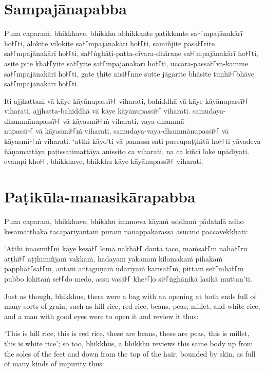\paliPage
\section*{Sampajānapabba}

Puna caparaṁ, bhikkhave, bhikkhu abhikkante paṭikkante sa꜔꜒mpajānakārī ho꜔꜒ti,
ālokite vilokite sa꜔꜒mpajānakārī ho꜔꜒ti, samiñjite pasā꜔꜒rite sa꜔꜒mpajānakārī ho꜔꜒ti,
sa꜔꜒ṅghāṭi-patta-cīvara-dhāraṇe sa꜔꜒mpajānakārī ho꜔꜒ti, asite pīte khā꜔꜒yite sā꜔꜒yite
sa꜔꜒mpajānakārī ho꜔꜒ti, uccāra-passā꜔꜒va-kamme sa꜔꜒mpajānakārī ho꜔꜒ti, gate ṭhite nisi꜔꜒nne
sutte jāgarite bhāsite tuṇhī꜔꜒bhāve sa꜔꜒mpajānakārī ho꜔꜒ti.

Iti ajjhattaṁ vā kāye kāyānupassī꜔꜒ viharati, bahiddhā vā kāye kāyānupassī꜔꜒
viharati, ajjhatta-bahiddhā vā kāye kāyānupassī꜔꜒ viharati. samudaya-dhammānupassī꜔꜒
vā kāyasmi꜔꜒ṁ viharati, vaya-dhammā-\\
nupassī꜔꜒ vā kāyasmi꜔꜒ṁ viharati, samudaya-vaya-dhammānupassī꜔꜒ vā kāyasmi꜔꜒ṁ viharati.
‘atthi kāyo’ti vā panassa sati paccupaṭṭhitā ho꜔꜒ti yāvadeva ñāṇamattāya
paṭissatimattāya anissito ca viharati, na ca kiñci loke upādiyati. evampi kho꜔꜒,
bhikkhave, bhikkhu kāye kāyānupassī꜔꜒ viharati.


\section*{Paṭikūla-manasikārapabba}

Puna caparaṁ, bhikkhave, bhikkhu imameva kāyaṁ uddhaṁ pādatalā adho kesamatthakā
tacapariyantaṁ pūraṁ nānappakārassa asucino paccavekkhati:

‘Atthi imasmi꜔꜒ṁ kāye kesā꜔꜒ lomā nakhā꜔꜒ dantā taco, maṁsa꜔꜒ṁ nahā꜔꜒rū aṭṭhī꜔꜒ aṭṭhimiñjaṁ
vakkaṁ, hadayaṁ yakanaṁ kilomakaṁ pihakaṁ papphā꜔꜒sa꜔꜒ṁ, antaṁ antaguṇaṁ udariyaṁ
karīsa꜔꜒ṁ, pittaṁ se꜔꜒mha꜔꜒ṁ pubbo lohitaṁ se꜔꜒do medo, assu vasā꜔꜒ khe꜔꜒ḷo si꜔꜒ṅghāṇikā
lasikā muttan’ti.

\englishPage

Just as though, bhikkhus, there were a bag with an opening at both ends full of
many sorts of grain, such as hill rice, red rice, beans, peas, millet, and white
rice, and a man with good eyes were to open it and review it thus:

‘This is hill rice, this is red rice, these are beans, these are peas, this is
millet, this is white rice’; so too, bhikkhus, a bhikkhu reviews this same body
up from the soles of the feet and down from the top of the hair, bounded by
skin, as full of many kinds of impurity thus:

